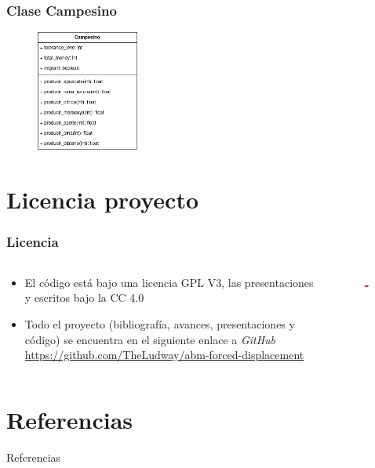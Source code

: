 \documentclass[17pt, t, lualatex]{beamer}
\begin{document}
\begin{frame}
  \frametitle{Clase Campesino}
  \begin{figure}[ht]
    \centering
    \includegraphics[width = 0.3\textwidth]{img/Migraciones.png}
  \end{figure}

\end{frame}


\section{Licencia proyecto}

\insertsectionpage


\begin{frame}
  \frametitle{Licencia}

\begin{columns}
  \begin{column}{.5\textwidth}
    \begin{itemize}
      \item El código está bajo una licencia GPL V3, las presentaciones y escritos bajo la CC 4.0
      \item Todo el proyecto (bibliografía, avances, presentaciones y código) se encuentra en el siguiente enlace a \textit{GitHub} \url{https://github.com/TheLudway/abm-forced-displacement}
    \end{itemize}
  \end{column}

  \begin{column}{.5\textwidth}
    \begin{figure}[ht]
      \centering
      \includegraphics[width = 0.7\textwidth]{img/gpl.png}
    \end{figure}

  \end{column}
\end{columns}


\end{frame}




\section{Referencias}

\insertsectionpage
\begin{frame}[allowframebreaks]{Referencias}
  \printbibliography
\end{frame}


\insertendpage
\end{document}
